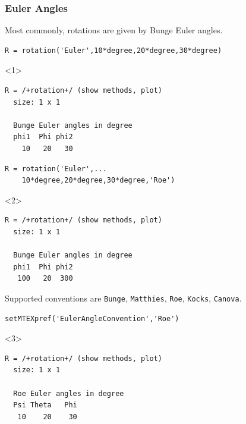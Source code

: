 \documentclass[compress]{beamer}
\begin{document}
\begin{frame}[fragile]
  \frametitle{Euler Angles}
  \begin{overlayarea}{\textwidth}{8cm}

  Most commonly, rotations are given by Bunge Euler angles.

  \begin{lstlisting}[style=input]
R = rotation('Euler',10*degree,20*degree,30*degree)
  \end{lstlisting}
  \begin{onlyenv}<1>
    \vspace{-0.3cm}
  \begin{lstlisting}[style=output]
R = /+rotation+/ (show methods, plot)
  size: 1 x 1

  Bunge Euler angles in degree
  phi1  Phi phi2
    10   20   30
  \end{lstlisting}
  \end{onlyenv}

  \pause
  \medskip

  \begin{lstlisting}[style=input]
R = rotation('Euler',...
    10*degree,20*degree,30*degree,'Roe')
  \end{lstlisting}
  \begin{onlyenv}<2>
    \vspace{-0.3cm}
  \begin{lstlisting}[style=output]
R = /+rotation+/ (show methods, plot)
  size: 1 x 1

  Bunge Euler angles in degree
  phi1  Phi phi2
   100   20  300
  \end{lstlisting}
\end{onlyenv}

\pause
\medskip

Supported conventions are \texttt{Bunge}, \texttt{Matthies}, \texttt{Roe},
\texttt{Kocks}, \texttt{Canova}.
  \begin{lstlisting}[style=input]
setMTEXpref('EulerAngleConvention','Roe')
  \end{lstlisting}

  \begin{onlyenv}<3>
    \vspace{-0.3cm}
  \begin{lstlisting}[style=output]
R = /+rotation+/ (show methods, plot)
  size: 1 x 1

  Roe Euler angles in degree
  Psi Theta   Phi
   10    20    30
 \end{lstlisting}
\end{onlyenv}
\end{overlayarea}
\end{frame}
\end{document}
